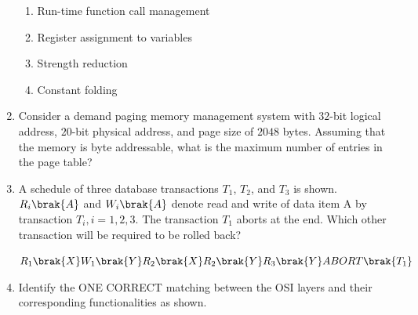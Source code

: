 \documentclass[a4paper, 11pt]{article}
\begin{document}
\begin{enumerate}
    \begin{enumerate}
        \item Run-time function call management
        \item Register assignment to variables
        \item Strength reduction
        \item Constant folding
    \end{enumerate}
    \hfill{}
    \item Consider a demand paging memory management system with $32$-bit logical address, $20$-bit physical address, and page size of $2048$ bytes. Assuming that the memory is byte addressable, what is the maximum number of entries in the page table?
    \begin{enumerate}
    \end{enumerate}
    \hfill{}
    \item A schedule of three database transactions $T_1$, $T_2$, and $T_3$ is shown. $R_i\brak{A}$ and $W_i\brak{A}$ denote read and write of data item A by transaction $T_i, i=1,2,3$. The transaction $T_1$ aborts at the end. Which other transaction will be required to be rolled back?
    \begin{center}
    $R_1\brak{X} W_1\brak{Y} R_2\brak{X} R_2\brak{Y} R_3\brak{Y} ABORT\brak{T_1}$
    \end{center}
    \begin{enumerate}
    \end{enumerate}
    \hfill{}
    \item Identify the ONE CORRECT matching between the OSI layers and their corresponding functionalities as shown.\\

\end{enumerate}
\end{document}
